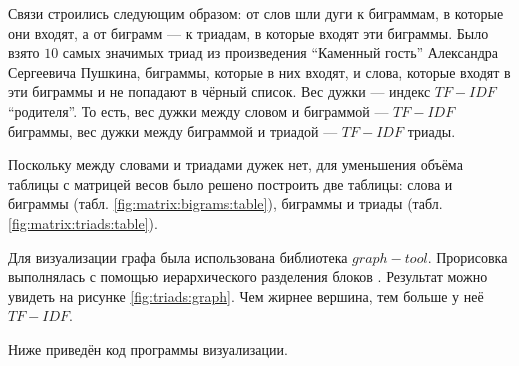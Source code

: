 Связи строились следующим образом:
от слов шли дуги к биграммам, в которые они входят,
а от биграмм --- к триадам, в которые входят эти биграммы.
Было взято $10$ самых значимых триад из произведения ``Каменный гость''
Александра Сергеевича Пушкина, биграммы, которые в них входят, и слова,
которые входят в эти биграммы и не попадают в чёрный список.
Вес дужки --- индекс $TF-IDF$ ``родителя''.
То есть, вес дужки между словом и биграммой --- $TF-IDF$ биграммы,
вес дужки между биграммой и триадой --- $TF-IDF$ триады.

Поскольку между словами и триадами дужек нет, для уменьшения объёма таблицы
с матрицей весов было решено построить две таблицы:
слова и биграммы (табл. \ref{fig:matrix:bigrams:table}),
биграммы и триады (табл. \ref{fig:matrix:triads:table}).

Для визуализации графа была использована библиотека $graph-tool$.
Прорисовка выполнялась с помощью иерархического разделения блоков \cite{Graph}.
Результат можно увидеть на рисунке \ref{fig:triads:graph}.
Чем жирнее вершина, тем больше у неё $TF-IDF$.

Ниже приведён код программы визуализации.

\lstset{inputencoding=utf8, extendedchars=\true}


\begin{sidewaystable}
  \centering
  \caption{Матрица весов графа слов и биграмм}
  \label{fig:matrix:bigrams:table}
\end{sidewaystable}

